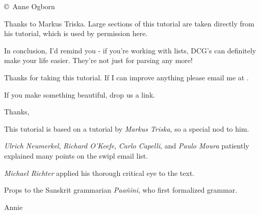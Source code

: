 \secdown
{}
\copyright\ Anne Ogborn 
\bigskip

Thanks to Markus Triska. Large sections of this tutorial are taken directly from
his tutorial, which is used by permission here.













In conclusion, I'd remind you - if you're working with lists, DCG's can
definitely make your life easier. They're not just for parsing any more!

Thanks for taking this tutorial. If I can improve anything please email me at
.

If you make something beautiful, drop us a link.

Thanks,

This tutorial is based on a tutorial by \emph{Markus Triska}, so a special nod
to him.

\emph{Ulrich Neumerkel}, \emph{Richard O'Keefe}, \emph{Carlo Capelli}, and
\emph{Paulo Moura} patiently explained many points on the swipl email list.

\emph{Michael Richter} applied his thorough critical eye to the text.

Props to the Sanskrit grammarian \emph{Paañini}, who first formalized grammar.


Annie

\secup